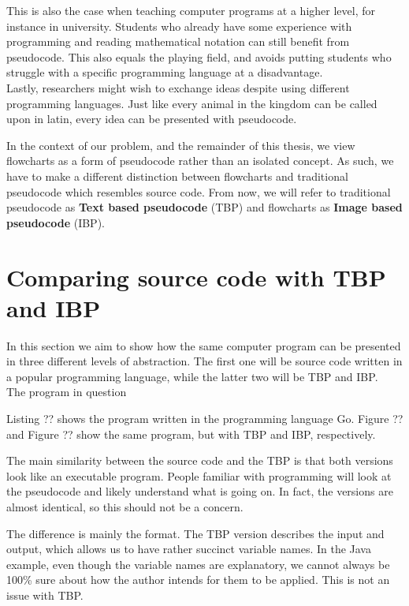 This is also the case when teaching computer programs at a higher level, for instance in university. Students who already have some experience with programming and reading mathematical notation can still benefit from pseudocode. This also equals the playing field, and avoids putting students who struggle with a specific programming language at a disadvantage. \hfill \\

Lastly, researchers might wish to exchange ideas despite using different programming languages. Just like every animal in the kingdom can be called upon in latin, every idea can be presented with pseudocode. \hfill \\


In the context of our problem, and the remainder of this thesis, we view flowcharts as a form of pseudocode rather than an isolated concept. As such, we have to make a different distinction between flowcharts and traditional pseudocode which resembles source code. From now, we will refer to traditional pseudocode as \textbf{Text based pseudocode} (TBP) and flowcharts as \textbf{Image based pseudocode} (IBP).

\section{Comparing source code with TBP and IBP}

In this section we aim to show how the same computer program can be presented in three different levels of abstraction. The first one will be source code written in a popular programming language, while the latter two will be TBP and IBP. \\

The program in question 

Listing ?? shows the program written in the programming language Go. Figure ?? and Figure ?? show the same program, but with TBP and IBP, respectively.

The main similarity between the source code and the TBP is that both versions look like an executable program. People familiar with programming will look at the pseudocode and likely understand what is going on. In fact, the versions are almost identical, so this should not be a concern. 

The difference is mainly the format. The TBP version describes the input and output, which allows us to have rather succinct variable names. In the Java example, even though the variable names are explanatory, we cannot always be 100\% sure about how the author intends for them to be applied. This is not an issue with TBP. \\

